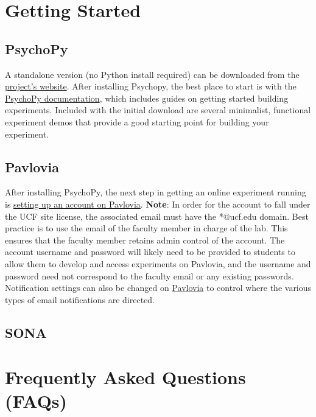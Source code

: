\documentclass[
]{book}
\begin{document}
\hypertarget{getting-started}{%
\section{Getting Started}\label{getting-started}}

\hypertarget{psychopy-1}{%
\subsection{PsychoPy}\label{psychopy-1}}

A standalone version (no Python install required) can be downloaded from the \href{https://www.psychopy.org/download.html}{project's website}. After installing Psychopy, the best place to start is with the \href{https://www.psychopy.org/documentation.html}{PsychoPy documentation}, which includes guides on getting started building experiments. Included with the initial download are several minimalist, functional experiment demos that provide a good starting point for building your experiment.

\hypertarget{pavlovia}{%
\subsection{Pavlovia}\label{pavlovia}}

After installing PsychoPy, the next step in getting an online experiment running is \href{https://gitlab.pavlovia.org/users/sign_in}{setting up an account on Pavlovia}. \textbf{Note}: In order for the account to fall under the UCF site license,
the associated email must have the *@ucf.edu domain. Best practice is to use the email of the faculty member in charge of the lab. This ensures that the faculty member retains admin control of the account. The account username and password will likely need to be provided to students to allow them to develop and access experiments on Pavlovia, and the username and password need not correspond to the faculty email or any existing passwords. Notification settings can also be changed on \href{https://gitlab.pavlovia.org/profile/emails}{Pavlovia} to control where the various types of email notifications are directed.

\hypertarget{sona}{%
\subsection{SONA}\label{sona}}

\hypertarget{frequently-asked-questions-faqs}{%
\section{Frequently Asked Questions (FAQs)}\label{frequently-asked-questions-faqs}}
\end{document}
